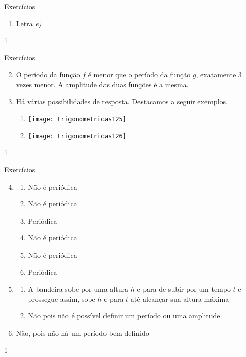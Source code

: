 \begin{answer}{Exercícios}
{\exerciselist
\begin{enumerate}
\item Letra \textit{e)}
\end{enumerate}
}{1}
\end{answer}
\clearmargin
\begin{answer}{Exercícios}
{\exerciselist
\begin{enumerate}\setcounter{enumi}{1}
\item O período da função $f$ é menor que o período da função $g$, exatamente $3$ vezes menor. A amplitude das duas funções é a mesma.
\item Há várias possibilidades de resposta. Destacamos a seguir exemplos.
\begin{enumerate}
\item {}
{
\texttt{[image: trigonometricas125]}
}
\item {}
{
\texttt{[image: trigonometricas126]}
}
\end{enumerate}
\end{enumerate}
}{1}
\end{answer}
\clearmargin
\begin{answer}{Exercícios}
{\exerciselist
\begin{enumerate}\setcounter{enumi}{3}
\item 
\begin{enumerate}
\item Não é periódica
\item Não é periódica
\item Periódica
\item Não é periódica
\item Não é periódica
\item Periódica
\end{enumerate}
\item 
\begin{enumerate}
\item A bandeira sobe por uma altura $h$ e para de subir por um tempo $t$ e prossegue assim, sobe $h$ e para $t$ até alcançar sua altura máxima
\item Não pois não é possível definir um período ou uma amplitude.
\end{enumerate}
\item Não, pois não há um período bem definido
\end{enumerate}
}{1}
\end{answer}
\clearmargin
